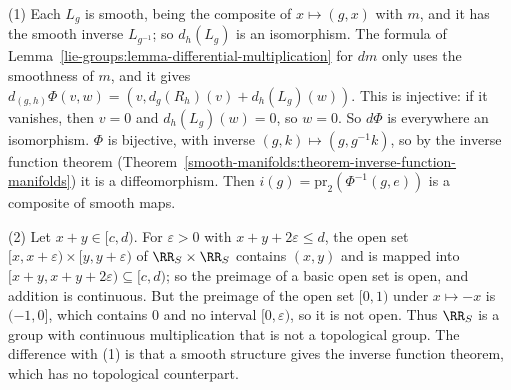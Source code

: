 \begin{solution}
(1) Each $L_g$ is smooth, being the composite of $x \mapsto (g, x)$ with $m$, and it has the smooth inverse $L_{g^{-1}}$; so $d_h(L_g)$ is an isomorphism. The formula of
Lemma~\ref{lie-groups:lemma-differential-multiplication} for $dm$ only uses the smoothness of $m$, and it gives $d_{(g, h)}\Phi(v, w) = (v, d_g(R_h)(v) + d_h(L_g)(w))$. This is injective:
if it vanishes, then $v = 0$ and $d_h(L_g)(w) = 0$, so $w = 0$. So $d\Phi$ is everywhere an isomorphism. $\Phi$ is bijective, with inverse $(g, k) \mapsto (g, g^{-1}k)$, so by the inverse
function theorem (Theorem~\ref{smooth-manifolds:theorem-inverse-function-manifolds}) it is a diffeomorphism. Then $i(g) = \mathrm{pr}_2(\Phi^{-1}(g, e))$ is a composite of smooth maps.

(2) Let $x + y \in [c, d)$. For $\varepsilon > 0$ with $x + y + 2\varepsilon \leq d$, the open set $[x, x + \varepsilon) \times [y, y + \varepsilon)$ of $\RR_S \times \RR_S$ contains $(x, y)$ and
is mapped into $[x + y, x + y + 2\varepsilon) \subseteq [c, d)$; so the preimage of a basic open set is open, and addition is continuous. But the preimage of the open set $[0, 1)$ under
$x \mapsto -x$ is $(-1, 0]$, which contains $0$ and no interval $[0, \varepsilon)$, so it is not open. Thus $\RR_S$ is a group with continuous multiplication that is not a topological group. The
difference with (1) is that a smooth structure gives the inverse function theorem, which has no topological counterpart.
\end{solution}
